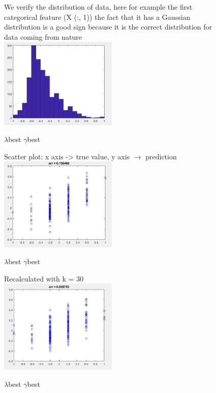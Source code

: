 \begin{figure}
	
	We verify the distribution of data, here for example the first categorical feature (X (:, 1))
	the fact that it has a Gaussian distribution is a good sign because it is the correct distribution for data coming from nature\\
	
	\includegraphics[width=0.5\textwidth]{hist2.png}
	\centering
	\caption{$\lambda$best $\gamma$best}
	
	
\end{figure}

\begin{figure}
	
	Scatter plot: x axis -> true value, y axis $\rightarrow$ prediction\\
	
	\includegraphics[width=0.5\textwidth]{scatter.png}
	\centering
	\caption{$\lambda$best $\gamma$best}
	
	
\end{figure}

\begin{figure}
	
	Recalculated with k = 30\\
	
	\includegraphics[width=0.5\textwidth]{scatter2.png}
	\centering
	\caption{$\lambda$best $\gamma$best}
	
	
\end{figure}


